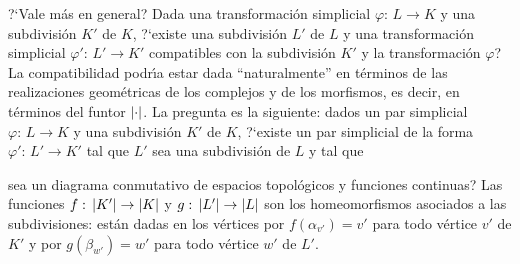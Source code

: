 \begin{obsSubdividirUnParSimplicial}\label{obs:subdividirunparsimplicial}
	?`Vale m\'{a}s en general? Dada una transformaci\'{o}n simplicial
	$\varphi:\,L\rightarrow K$ y una subdivisi\'{o}n $K'$ de $K$,
	?`existe una subdivisi\'{o}n $L'$ de $L$ y una transformaci\'{o}n
	simplicial $\varphi':\,L'\rightarrow K'$ compatibles con la
	subdivisi\'{o}n $K'$ y la transformaci\'{o}n $\varphi$?
	La compatibilidad podr\'{\i}a estar dada ``naturalmente'' en
	t\'{e}rminos de las realizaciones geom\'{e}tricas de los complejos
	y de los morfismos, es decir, en t\'{e}rminos del funtor
	$\left|\cdot\right|$. La pregunta es la siguiente: dados un par simplicial
	$\varphi:\,L\rightarrow K$ y una subdivisi\'{o}n $K'$ de $K$, ?`existe
	un par simplicial de la forma $\varphi':\,L'\rightarrow K'$ tal que
	$L'$ sea una subdivisi\'{o}n de $L$ y tal que
	\begin{center}
	\end{center}
	sea un diagrama conmutativo de espacios topol\'{o}gicos y funciones
	continuas? Las funciones $f:\,\left|K'\right|\rightarrow\left|K\right|$ y
	$g:\,\left|L'\right|\rightarrow\left|L\right|$ son los homeomorfismos asociados
	a las subdivisiones: est\'{a}n dadas en los v\'{e}rtices por
	$f(\alpha_{v'})=v'$ para todo v\'{e}rtice $v'$ de $K'$ y por
	$g(\beta_{w'})=w'$ para todo v\'{e}rtice $w'$ de $L'$.


\end{obsSubdividirUnParSimplicial}
